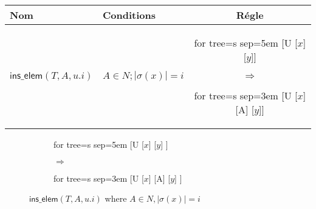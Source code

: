 \begin{table}
	\begin{tabular}{|l|l|c|}
		\hline
		\textbf{Nom} & \textbf{Conditions} & \textbf{Régle} \\
		\hline
		\hline
		$\textsf{ins\_elem}(T, A, u.i)$ & $A \in N; |\sigma(x)| = i$ & \begin{forest}for tree={s sep=5em} [U [$x$] [$y$]]\end{forest} \quad $\Rightarrow$ \quad \begin{forest} for tree={s sep=3em} [U [$x$] [A] [$y$]] \end{forest} \\
		\hline
	\end{tabular}
\end{table}


\begin{figure}[H]
	\centering
	\begin{subfigure}{0.4\textwidth}
		\centering
		\begin{adjustbox}{valign=c, max width=\textwidth}
			\begin{forest}
			for tree={s sep=5em}
			[U
				[$x$]
				[$y$]
			]
			\end{forest}
		\end{adjustbox}
		\caption{}
	\end{subfigure}
	\begin{subfigure}{0.1\textwidth}
		\centering
		\huge{$\Rightarrow$}
	\end{subfigure}
	\begin{subfigure}{0.4\textwidth}
		\centering
		\begin{adjustbox}{valign=c, max width=\textwidth}
			\begin{forest}
			for tree={s sep=3em}
			[U
				[$x$]
				[A]
				[$y$]
			]
			\end{forest}
		\end{adjustbox}
		\caption{}
	\end{subfigure}
	\caption{$\textsf{ins\_elem}(T, A, u.i)$ where $A \in N, |\sigma(x)| = i$}
	\label{fig:sch:op:insElem}
\end{figure}


